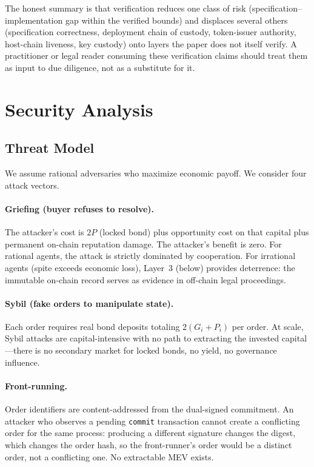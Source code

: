 \documentclass[11pt,a4paper]{article}
\theoremstyle{definition}
\theoremstyle{remark}
\newcommand{\pay}{P}
\newcommand{\cumval}{G}
\begin{document}
The honest summary is that verification reduces one class of risk
(specification--implementation gap within the verified bounds) and
displaces several others (specification correctness, deployment
chain of custody, token-issuer authority, host-chain liveness, key
custody) onto layers the paper does not itself verify. A
practitioner or legal reader consuming these verification claims
should treat them as input to due diligence, not as a substitute
for it.

\section{Security Analysis}
\label{sec:security}

\subsection{Threat Model}

We assume rational adversaries who maximize economic payoff. We
consider four attack vectors.

\paragraph{Griefing (buyer refuses to resolve).}
The attacker's cost is $2\pay$ (locked bond) plus opportunity cost on
that capital plus permanent on-chain reputation damage. The attacker's
benefit is zero. For rational agents, the attack is strictly
dominated by cooperation. For irrational agents (spite exceeds
economic loss), Layer~3 (below) provides deterrence: the immutable
on-chain record serves as evidence in off-chain legal proceedings.

\paragraph{Sybil (fake orders to manipulate state).}
Each order requires real bond deposits totaling $2(\cumval_i +
\pay_i)$ per order. At scale, Sybil attacks are capital-intensive
with no path to extracting the invested capital---there is no
secondary market for locked bonds, no yield, no governance influence.

\paragraph{Front-running.}
Order identifiers are content-addressed from the dual-signed
commitment. An attacker who observes a pending \texttt{commit}
transaction cannot create a conflicting order for the same process:
producing a different signature changes the digest, which changes
the order hash, so the front-runner's order would be a distinct
order, not a conflicting one. No extractable MEV exists.
\end{document}
